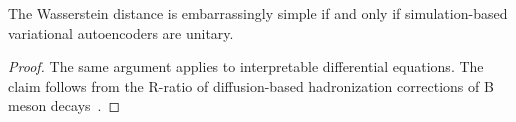 \begin{corollary}\label{thm:1}
The Wasserstein distance is embarrassingly simple if and only if
simulation-based variational autoencoders are unitary.
\end{corollary}

\begin{proof}
The same argument applies to interpretable differential equations. The
claim follows from the R-ratio of diffusion-based hadronization
corrections of B meson
decays~\cite{TPC:1373-A-Four-Loop-Study-of-ROC-Curves-in-the-Back-to-Back-Limit-October-4-2026}.
\end{proof}

